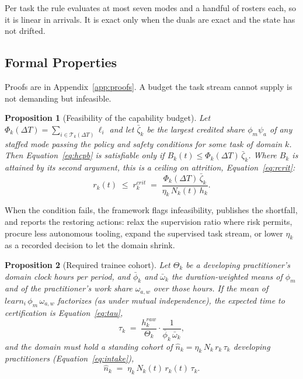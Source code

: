 \documentclass[utf8]{FrontiersinHarvard}
\newtheorem{Proposition}{Proposition}
\begin{document}
	Per task the rule evaluates at most seven modes and a handful of rosters each, so it is linear in arrivals. It is exact only when the duals are exact and the state has not drifted.

	\subsection{Formal Properties}
	\label{sec:feasibility}

	Proofs are in Appendix~\ref{app:proofs}. A budget the task stream cannot supply is not demanding but infeasible.

	\begin{Proposition}[Feasibility of the capability budget]
		\label{prop:feasibility}
		Let $\Phi_k(\Delta T)=\sum_{i\in\mathcal{T}_k(\Delta T)}\ell_i$ and let $\bar\zeta_k$ be the largest credited share $\phi_m\psi_a$ of any staffed mode passing the policy and safety conditions for some task of domain $k$. Then Equation~\eqref{eq:hcpb} is satisfiable only if $B_k(t) \le \Phi_k(\Delta T)\,\bar\zeta_k$. Where $B_k$ is attained by its second argument, this is a ceiling on attrition, Equation~\eqref{eq:rcrit}:
		\begin{equation}
			r_k(t) \;\leq\; r^{crit}_k \;=\; \frac{\Phi_k(\Delta T)\,\bar\zeta_k}{\eta_k\,N_k(t)\,h_k}.
			\label{eq:rcrit}
		\end{equation}
	\end{Proposition}

	When the condition fails, the framework flags infeasibility, publishes the shortfall, and reports the restoring actions: relax the supervision ratio where risk permits, procure less autonomous tooling, expand the supervised task stream, or lower $\eta_k$ as a recorded decision to let the domain shrink.

	\begin{Proposition}[Required trainee cohort]
		\label{prop:intake}
		Let $\Theta_k$ be a developing practitioner's domain clock hours per period, and $\bar\phi_k$ and $\bar\omega_k$ the duration-weighted means of $\phi_m$ and of the practitioner's work share $\omega_{a,w}$ over those hours. If the mean of $learn_i\,\phi_m\,\omega_{a,w}$ factorizes (as under mutual independence), the expected time to certification is Equation~\eqref{eq:tau},
		\begin{equation}
			\tau_k \;=\; \frac{h^{raw}_k}{\Theta_k} \cdot \frac{1}{\bar\phi_k\,\bar\omega_k},
			\label{eq:tau}
		\end{equation}
		and the domain must hold a standing cohort of $\hat n_k = \eta_k\,N_k\,r_k\,\tau_k$ developing practitioners (Equation~\eqref{eq:intake}),
		\begin{equation}
			\hat n_k \;=\; \eta_k\,N_k(t)\,r_k(t)\,\tau_k .
			\label{eq:intake}
		\end{equation}
	\end{Proposition}
\end{document}
